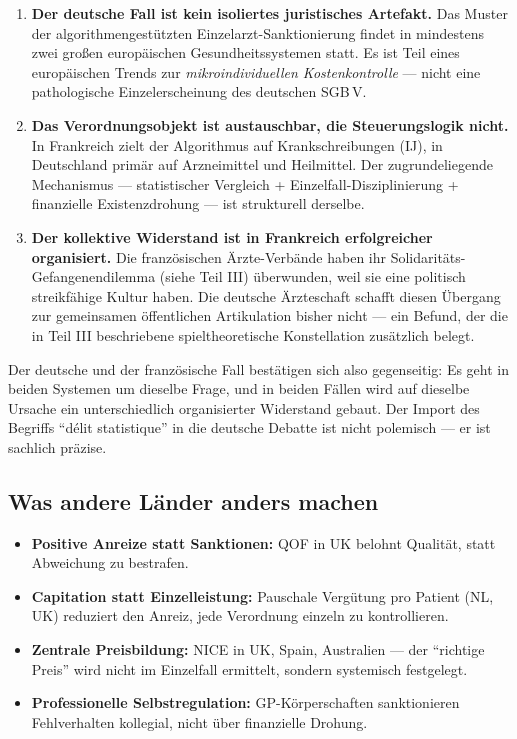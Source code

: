 \documentclass{umbruch-position}
\begin{document}
\begin{enumerate}
  \item \textbf{Der deutsche Fall ist kein isoliertes juristisches Artefakt.} Das Muster der algorithmengestützten Einzelarzt-Sanktionierung findet in mindestens zwei großen europäischen Gesundheitssystemen statt. Es ist Teil eines europäischen Trends zur \textit{mikroindividuellen Kostenkontrolle} --- nicht eine pathologische Einzelerscheinung des deutschen SGB\,V.
  \item \textbf{Das Verordnungsobjekt ist austauschbar, die Steuerungslogik nicht.} In Frankreich zielt der Algorithmus auf Krankschreibungen (IJ), in Deutschland primär auf Arzneimittel und Heilmittel. Der zugrundeliegende Mechanismus --- statistischer Vergleich + Einzelfall-Disziplinierung + finanzielle Existenzdrohung --- ist strukturell derselbe.
  \item \textbf{Der kollektive Widerstand ist in Frankreich erfolgreicher organisiert.} Die französischen Ärzte-Verbände haben ihr Solidaritäts-Gefangenendilemma (siehe Teil III) überwunden, weil sie eine politisch streikfähige Kultur haben. Die deutsche Ärzteschaft schafft diesen Übergang zur gemeinsamen öffentlichen Artikulation bisher nicht --- ein Befund, der die in Teil III beschriebene spieltheoretische Konstellation zusätzlich belegt.
\end{enumerate}

Der deutsche und der französische Fall bestätigen sich also gegenseitig: Es geht in beiden Systemen um dieselbe Frage, und in beiden Fällen wird auf dieselbe Ursache ein unterschiedlich organisierter Widerstand gebaut. Der Import des Begriffs ``d\'elit statistique'' in die deutsche Debatte ist nicht polemisch --- er ist sachlich präzise.

\subsection{Was andere Länder anders machen}

\begin{itemize}[nosep]
  \item \textbf{Positive Anreize statt Sanktionen:} QOF in UK belohnt Qualität, statt Abweichung zu bestrafen.
  \item \textbf{Capitation statt Einzelleistung:} Pauschale Vergütung pro Patient (NL, UK) reduziert den Anreiz, jede Verordnung einzeln zu kontrollieren.
  \item \textbf{Zentrale Preisbildung:} NICE in UK, Spain, Australien --- der ``richtige Preis'' wird nicht im Einzelfall ermittelt, sondern systemisch festgelegt.
  \item \textbf{Professionelle Selbstregulation:} GP-Körperschaften sanktionieren Fehlverhalten kollegial, nicht über finanzielle Drohung.
\end{itemize}
\end{document}
